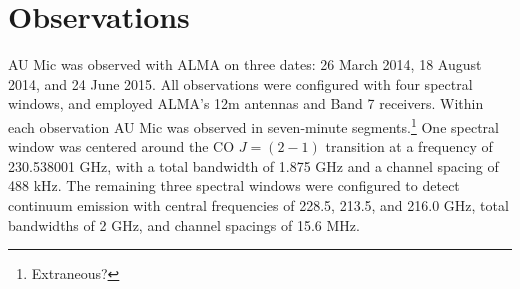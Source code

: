 \documentclass[12pt,oneside]{book}
\begin{document}
\frontmatter %


% 
% 






\mainmatter %
% 

\chapter{Observations}
AU Mic was observed  with ALMA on three dates: 26 March 2014, 18 August 2014, and 24 June 2015. 
All observations were configured with four spectral windows, and employed ALMA's 12m antennas and Band 7 receivers. 
Within each observation AU Mic was observed in seven-minute segments.\footnote{Extraneous?}
One spectral window was centered around the CO $J = (2-1)$ transition at a frequency of 230.538001 GHz, with a total bandwidth of 1.875 GHz and a channel spacing of 488 kHz.
The remaining three spectral windows were configured to detect continuum emission with central frequencies of 228.5, 213.5, and 216.0 GHz, total bandwidths of 2 GHz, and channel spacings of 15.6 MHz. 
\end{document}
